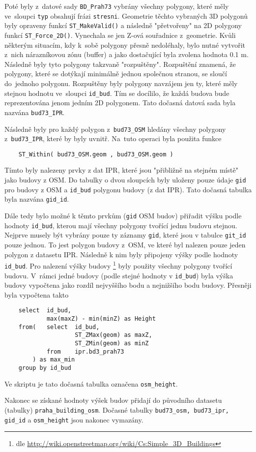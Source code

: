 Poté byly z~datové sady {\tt BD\_Prah73} vybrány všechny polygony,
které měly ve~sloupci {\tt typ} obsahují frázi {\tt stresni}.
Geometrie těchto vybraných 3D polygonů byly opraveny funkcí
{\tt ST\_MakeValid()} a následně "přetvořeny" na 2D polygony funkcí
{\tt ST\_Force\_2D()}. Vynechala se jen Z-ová souřadnice z~geometrie.
Kvůli některým situacím, kdy k~sobě polygony přesně nedoléhaly, bylo
nutné vytvořit z~nich nárazníkovou zónu (buffer) a jako dostačující
byla zvolena hodnota 0.1 m. Následně byly tyto polygony takzvaně
"rozpuštěny". Rozpuštění znamená, že polygony, které se dotýkají
minimálně jednou společnou stranou, se sloučí do~jednoho polygonu.
Rozpuštěny byly polygony navzájem jen ty, které měly stejnou hodnotu
ve~sloupci {\tt id\_bud}. Tím se docílilo, že každá budova bude
reprezentována jenom jedním 2D polygonem. Tato dočasná datová sada
byla nazvána {\tt bud73\_IPR}.

Následně byly pro každý polygon z~{\tt bud73\_OSM} hledány
všechny polygony z~{\tt bud73\_IPR}, které by byly uvnitř.
Na~tuto operaci byla použita funkce
\begin{verbatim}
    ST_Within( bud73_OSM.geom , bud73_OSM.geom )
\end{verbatim}
Tímto byly nalezeny prvky z dat IPR, které jsou "přibližně na stejném
místě" jako budovy z OSM. Do tabulky o dvou sloupcích byly uloženy
pouze údaje {\tt gid} pro budovy z OSM a {\tt id\_bud} polygonu budovy
(z dat IPR). Tato dočasná tabulka byla nazvána {\tt gid\_id}.

Dále tedy bylo možné k těmto prvkům ({\tt gid} OSM budov) přiřadit
výšku podle hodnoty {\tt id\_bud}, kterou mají všechny polygony
tvořící jednu budovu stejnou. Nejprve musely být vybrány pouze ty
záznamy {\tt gid}, které jsou v tabulce {\tt git\_id} pouze jednou.
To jest polygon budovy z~OSM, ve které byl nalezen pouze jeden polygon
z datasetu IPR. Následně k nim byly připojeny výšky podle hodnoty
{\tt id\_bud}. Pro nalezení výšky budovy \footnote{dle \url{http://wiki.openstreetmap.org/wiki/Cs:Simple_3D_Buildings}}
byly použity všechny polygony tvořící budovu. V~rámci jedné budovy
(podle stejné hodnoty v {\tt id\_bud}) byla výška budovy vypočtena
jako rozdíl nejvyššího bodu a nejnižšího bodu budovy.
Přesněji byla vypočtena takto
\begin{verbatim}
    select	id_bud,
            max(maxZ) - min(minZ) as Height
    from(   select	id_bud,
                    ST_ZMax(geom) as maxZ,
                    ST_ZMin(geom) as minZ
            from    ipr.bd3_prah73
        ) as max_min
    group by id_bud
\end{verbatim}
Ve skriptu je tato dočasná tabulka označena {\tt osm\_height}.

Nakonec se získané hodnoty výšek budov přidají do původního datasetu
(tabulky) {\tt praha\_building\_osm}. 
Dočasné tabulky {\tt bud73\_osm, bud73\_ipr, gid\_id} a
{\tt osm\_height} jsou nakonec vymazány.






